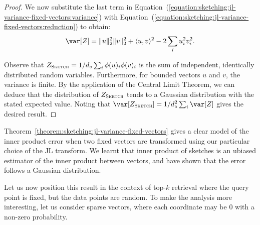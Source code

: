 \begin{proof}
    We now substitute the last term in Equation~(\ref{equation:sketching:jl-variance-fixed-vectors:variance}) with
    Equation~(\ref{equation:sketching:jl-variance-fixed-vectors:reduction}) to obtain:
    \begin{equation*}
    \var[Z] = \lVert u \rVert_2^2 \lVert v \rVert_2^2 + \langle u, v \rangle^2 - 2 \sum_i u_i^2 v_i^2.
    \end{equation*}
    
    Observe that $Z_\textsc{Sketch} = 1/d_\circ \sum_i \phi(u)_i \phi(v)_i$ is
    the sum of independent, identically distributed random variables.
    Furthermore, for bounded vectors $u$ and $v$, the variance is finite.
    By the application of the Central Limit Theorem, we can deduce that
    the distribution of $Z_\textsc{Sketch}$ tends to a Gaussian distribution
    with the stated expected value. Noting that
    $\var[Z_\textsc{Sketch}] = 1/d_\circ^2 \sum_i \var[Z]$
    gives the desired result.
\end{proof}

\begin{svgraybox}
    Theorem~\ref{theorem:sketching:jl-variance-fixed-vectors} gives a clear model
    of the inner product error when two fixed vectors are transformed using our particular
    choice of the JL transform. We learnt that inner product of sketches is an ubiased
    estimator of the inner product between vectors, and have shown that the error
    follows a Gaussian distribution.
\end{svgraybox}

Let us now position this result in the context of top-$k$ retrieval
where the query point is fixed, but the data points are random.
To make the analysis more interesting, let us consider sparse vectors,
where each coordinate may be $0$ with a non-zero probability.

